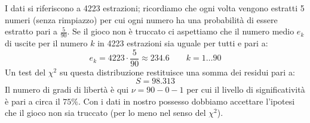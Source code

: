\begin{exemplify}
{I dati si riferiscono a 4223 estrazioni; ricordiamo che ogni volta vengono
estratti 5 numeri (senza rimpiazzo) per cui ogni numero ha una probabilit\`a
di essere estratto pari a $\frac{5}{90}$.
Se il gioco non \`e truccato ci aspettiamo che il numero medio $e_k$ di uscite
per il numero $k$ in 4223 estrazioni sia uguale per tutti e pari a:
$$
e_k = 4223 \cdot \frac{5}{90} \approx 234.6 \qquad k = 1\ldots 90
$$
Un test del $\chi^2$ su questa distribuzione restituisce una somma dei
residui pari a:
$$
S = 98.313
$$
Il numero di gradi di libert\`a \`e qui $\nu = 90 - 0 - 1$ per cui il
livello di significativit\`a \`e pari a circa il $75\%$.
Con i dati in nostro possesso dobbiamo accettare l'ipotesi che il gioco non
sia truccato (per lo meno nel senso del $\chi^2$).}


\end{exemplify}


